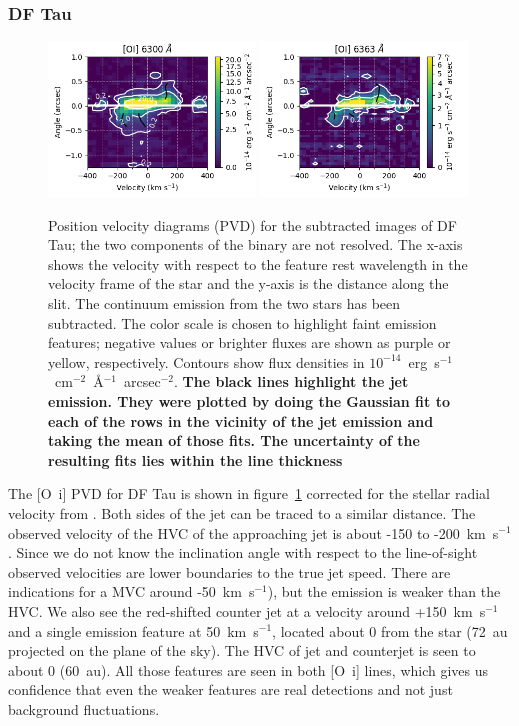 \documentclass[twocolumn]{aastex62}
\begin{document}
\subsubsection{DF Tau}
\begin{figure}
\begin{center}
\includegraphics[width=0.49\textwidth]{DF_6300.png}
\includegraphics[width=0.49\textwidth]{DF_6363.png}
\caption{Position velocity diagrams (PVD) for the subtracted images
of DF Tau; the two components of the binary are not resolved. The x-axis
shows the velocity with respect to the feature rest wavelength in the
velocity frame of the star and the y-axis is the distance along the slit. The
continuum emission from the two stars has been subtracted. The color scale is chosen to highlight faint emission features; negative values or brighter fluxes are shown as purple or yellow, respectively. Contours show flux densities in $10^{-14}$~erg~s$^{-1}$~cm$^{-2}$~\AA{}$^{-1}$~arcsec$^{-2}$.
\textbf{The black lines highlight the jet emission. They were plotted by doing the Gaussian fit to each of the rows in the vicinity of the jet emission and taking the mean of those fits. The uncertainty of the resulting fits lies within the line thickness}
\label{fig:DFTau}}
\end{center}
\end{figure}
The [O~{\sc i}] PVD for DF Tau is shown in figure~\ref{fig:DFTau}
corrected for the stellar radial velocity from \citet{2006AstL...32..759G}.
Both sides of the jet can be traced to a similar distance. The observed velocity of the HVC of the approaching jet is about -150 to -200~km~s$^{-1}$. Since we do not know the inclination angle with respect to the line-of-sight observed velocities are lower boundaries to the true jet speed. There are indications for a MVC around -50~km~s$^{-1}$), but the emission is weaker than the HVC. We also see the red-shifted counter jet at a velocity around +150~km~s$^{-1}$ and a single emission feature at 50~km~s$^{-1}$, located about 0 from the star (72~au projected on the plane of the sky). The HVC of jet and counterjet is seen to about 0 (60~au). All those features are seen in both [O~{\sc i}] lines, which gives us confidence that even the weaker features are real detections and not just background fluctuations.
\end{document}
